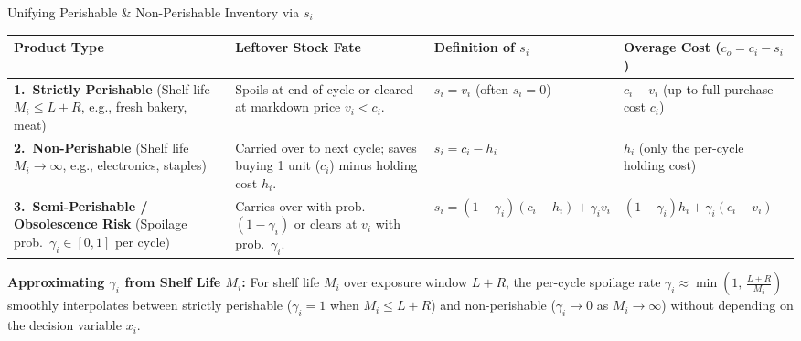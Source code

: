 \documentclass[11pt]{beamer}
\begin{document}
\begin{frame}[allowframebreaks]{Unifying Perishable \& Non-Perishable Inventory via $s_i$}
\begin{scriptsize}
\renewcommand{\arraystretch}{1.05}
\begin{tabular}{@{}>{\raggedright\arraybackslash}p{} >{\raggedright\arraybackslash}p{} >{\raggedright\arraybackslash}p{} >{\raggedright\arraybackslash}p{}@{}}
\toprule
\textbf{Product Type} & \textbf{Leftover Stock Fate} & \textbf{Definition of $s_i$} & \textbf{Overage Cost ($c_o = c_i - s_i$)} \\
\midrule
\textbf{1.\ Strictly Perishable} \newline (Shelf life $M_i \leq L+R$, e.g., fresh bakery, meat) & Spoils at end of cycle or cleared at markdown price $v_i < c_i$. & $s_i = v_i$ \newline (often $s_i = 0$) & $c_i - v_i$ \newline (up to full purchase cost $c_i$) \\
\midrule
\textbf{2.\ Non-Perishable} \newline (Shelf life $M_i \to \infty$, e.g., electronics, staples) & Carried over to next cycle; saves buying 1 unit ($c_i$) minus holding cost $h_i$. & $s_i = c_i - h_i$ & $h_i$ \newline (only the per-cycle holding cost) \\
\midrule
\textbf{3.\ Semi-Perishable / Obsolescence Risk} \newline (Spoilage prob.\ $\gamma_i \in [0,1]$ per cycle) & Carries over with prob.\ $(1-\gamma_i)$ or clears at $v_i$ with prob.\ $\gamma_i$. & $s_i = (1-\gamma_i)(c_i - h_i) + \gamma_i v_i$ & $(1-\gamma_i)h_i + \gamma_i(c_i - v_i)$ \\
\bottomrule
\end{tabular}

\vspace{0.35em}
\textbf{Approximating $\gamma_i$ from Shelf Life $M_i$:} For shelf life $M_i$ over exposure window $L+R$, the per-cycle spoilage rate $\gamma_i \approx \min\!\left(1,\, \frac{L + R}{M_i}\right)$ smoothly interpolates between strictly perishable ($\gamma_i = 1$ when $M_i \leq L+R$) and non-perishable ($\gamma_i \to 0$ as $M_i \to \infty$) without depending on the decision variable $x_i$.
\end{scriptsize}
\end{frame}
\end{document}
